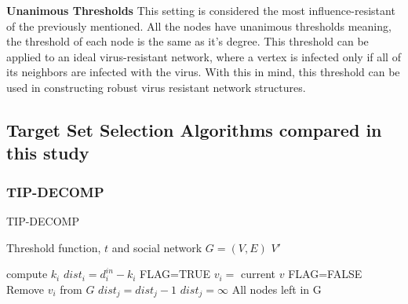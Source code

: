 \textbf{Unanimous Thresholds} This setting is considered the most influence-resistant of the previously mentioned.\cite{chen} All the nodes have unanimous thresholds meaning, the threshold of each node is the same as it's degree. This threshold can be applied to an ideal virus-resistant network, where a vertex is infected only if all of its neighbors are infected with the virus. With this in mind, this threshold can be used in constructing robust virus resistant network structures.\cite{chen}
\subsection{Target Set Selection Algorithms compared in this study}

\subsubsection{TIP-DECOMP}
\begin{algorithm}
	\caption{TIP-DECOMP}
	\begin{algorithmic}[1]
		\Require Threshold function, $t$ and social network $G=(V,E)$
		\Ensure $V'$
		
			\State compute $k_{i}$ 
		\EndFor
			\State $dist_{i}=d_{i}^{in}-k_{i} $
		\EndFor
		\State FLAG=TRUE 
					\State $v_{i}=$ current $v$
				\EndIf
			\EndFor
				\State FLAG=FALSE 
			\Else
			\State Remove $v_{i}$ from $G$ 
						\State $dist_{j}=dist_{j}-1$
					\Else
						\State$dist_{j}=\infty$  
					\EndIf
				\EndFor
			\EndIf
		\EndWhile
		\State \Return All nodes left in G 
	\end{algorithmic}
\end{algorithm}

